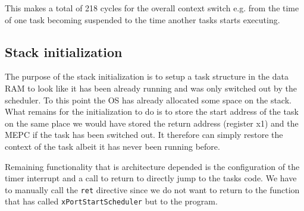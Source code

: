 This makes a total of 218 cycles for the overall context switch e.g. from the time of one task becoming suspended to the time another tasks starts executing.

\subsection{Stack initialization}

The purpose of the stack initialization is to setup a task structure in the data RAM to look like it has been already running and was only switched out by the scheduler. To this point the OS has already allocated some space on the stack. What remains for the initialization to do is to store the start address of the task on the same place we would have stored the return address (register x1) and the MEPC if the task has been switched out. It therefore can simply restore the context of the task albeit it has never been running before.

Remaining functionality that is architecture depended is the configuration of the timer interrupt and a call to return to directly jump to the tasks code. We have to manually call the \verb+ret+ directive since we do not want to return to the function that has called \verb+xPortStartScheduler+ but to the program.

